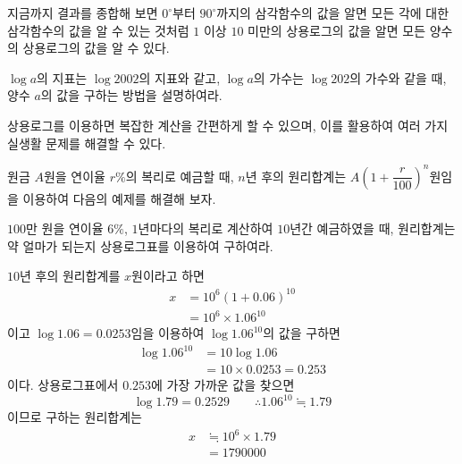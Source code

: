 \documentclass[11pt, a4paper]{book}
\begin{document}
지금까지 결과를 종합해 보면 $0^{\circ}$부터 $90^{\circ}$까지의 삼각함수의 값을 알면 모든 각에 대한 삼각함수의 값을 알 수 있는 것처럼 $1$ 이상 $10$ 미만의 상용로그의 값을 알면 모든 양수의 상용로그의 값을 알 수 있다.
\begin{problem}
	$\log a$의 지표는 $\log 2002$의 지표와 같고, $\log a$의 가수는 $\log 202$의 가수와 같을 때, 양수 $a$의 값을 구하는 방법을 설명하여라.
\end{problem}
상용로그를 이용하면 복잡한 계산을 간편하게 할 수 있으며, 이를 활용하여 여러 가지 실생활 문제를 해결할 수 있다.  

원금 $A$원을 연이율 $r\%$의 복리로 예금할 때, $n$년 후의 원리합계는 $A\left(1 +\dfrac{r}{100}\right)^{n}$원임을 이용하여 다음의 예제를 해결해 보자.
\begin{example}
	$100$만 원을 연이율 $6\%$, $1$년마다의 복리로 계산하여 $10$년간 예금하였을 때, 원리합계는 약 얼마가 되는지 상용로그표를 이용하여 구하여라.
	\begin{solution}
		$10$년 후의 원리합계를 $x$원이라고 하면
	\begin{align*}
		x&=10^{6}(1+0.06)^{10}\\
		  &=10^{6}\times 1.06^{10} 
	\end{align*}
이고 	$\log 1.06=0.0253$임을 이용하여 $\log 1.06^{10}$의 값을 구하면
	\begin{align*}
		\log 1.06^{10}&=10\log 1.06\\
		                    	&=10\times 0.0253=0.253
	\end{align*}
이다. 상용로그표에서 $0.253$에 가장 가까운 값을 찾으면
	\[
	\log 1.79=0.2529\qquad    \therefore  1.06^{10} \fallingdotseq 1.79
	\]
이므로 구하는 원리합계는 
	\begin{align*}
		x &\fallingdotseq 10^{6}\times 1.79 \\
			&=1790000
	\end{align*}
		
	\end{solution}
\end{example}
\end{document}
